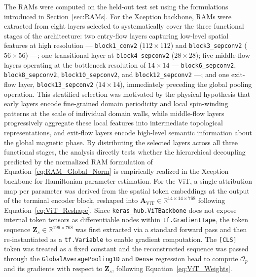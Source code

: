\documentclass[a4paper,fleqn]{cas-sc}
\begin{document}
The RAMs were computed on the held-out test set 
using the formulations introduced in 
Section~\ref{sec:RAMs}. For the Xception 
backbone, RAMs were extracted from eight layers 
selected to systematically cover the three 
functional stages of the architecture: two 
entry-flow layers capturing low-level spatial 
features at high resolution --- 
\texttt{block1\_conv2} ($112\times112$) and 
\texttt{block3\_sepconv2} ($56\times56$) ---; 
one transitional layer at 
\texttt{block4\_sepconv2} ($28\times28$); five 
middle-flow layers operating at the bottleneck 
resolution of $14\times14$ --- 
\texttt{block6\_sepconv2}, 
\texttt{block8\_sepconv2}, 
\texttt{block10\_sepconv2}, and 
\texttt{block12\_sepconv2} ---; and one 
exit-flow layer, \texttt{block13\_sepconv2} 
($14\times14$), immediately preceding the 
global pooling operation. This stratified 
selection was motivated by the physical 
hypothesis that early layers encode 
fine-grained domain periodicity and local 
spin-winding patterns at the scale of 
individual domain walls, while middle-flow 
layers progressively aggregate these local 
features into intermediate topological 
representations, and exit-flow layers encode 
high-level semantic information about the 
global magnetic phase. By distributing the 
selected layers across all three functional 
stages, the analysis directly tests whether 
the hierarchical decoupling predicted by the 
normalized RAM formulation of 
Equation~\ref{eq:RAM_Global_Norm} is 
empirically realized in the Xception backbone 
for Hamiltonian parameter estimation. For the 
ViT, a single attribution map per parameter 
was derived from the spatial token embeddings 
at the output of the terminal encoder block, 
reshaped into $\mathbf{A}_{\text{ViT}} \in 
\mathbb{R}^{14\times14\times768}$ following 
Equation~\ref{eq:ViT_Reshape}. Since 
\texttt{keras\_hub.ViTBackbone} does not expose 
internal token tensors as differentiable nodes 
within \texttt{tf.GradientTape}, the token 
sequence $\mathbf{Z}_s \in 
\mathbb{R}^{196\times768}$ was first extracted 
via a standard forward pass and then 
re-instantiated as a \texttt{tf.Variable} to 
enable gradient computation. The 
\texttt{[CLS]} token was treated as a fixed 
constant and the reconstructed sequence was 
passed through the \texttt{GlobalAveragePooling1D} 
and \texttt{Dense} regression head to compute 
$\mathcal{O}_p$ and its gradients with respect 
to $\mathbf{Z}_s$, following 
Equation~\ref{eq:ViT_Weights}.
\end{document}
